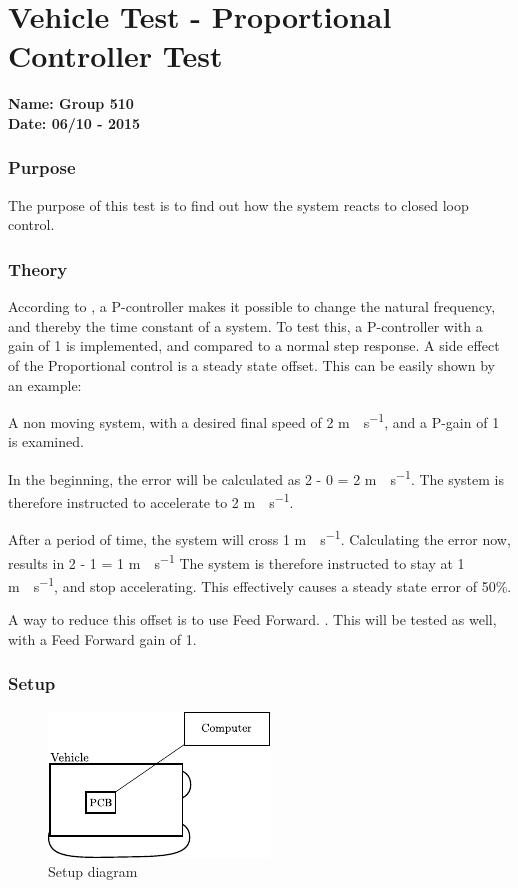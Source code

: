 \pagebreak
\section{Vehicle Test - Proportional Controller Test} \label{app:proportionalControllerTest}
\textbf{Name: Group 510}\\
\textbf{Date: 06/10 - 2015}

\subsubsection{Purpose}
The purpose of this test is to find out how the system reacts to closed loop control.

\subsubsection{Theory}
According to \cite{Franklin}, a P-controller makes it possible to change the natural frequency, and thereby the time constant of a system. To test this, a P-controller with a gain of 1 is implemented, and compared to a normal step response.
A side effect of the Proportional control is a steady state offset. This can be easily shown by an example:

A non moving system, with a desired final speed of 2 \si{m \cdot s^{-1}}, and a P-gain of 1 is examined.

In the beginning, the error will be calculated as 2 - 0 = 2 \si{m \cdot s^{-1}}. The system is therefore instructed to accelerate to 2 \si{m \cdot s^{-1}}.

After a period of time, the system will cross 1 \si{m \cdot s^{-1}}. Calculating the error now, results in 2 - 1 = 1 \si{m \cdot s^{-1}}
The system is therefore instructed to stay at 1 \si{m \cdot s^{-1}}, and stop accelerating. This effectively causes a steady state error of 50\%.

A way to reduce this offset is to use Feed Forward. \cite{Aastrom}. This will be tested as well, with a Feed Forward gain of 1.

\subsubsection{Setup}

\begin{figure}[H]
	\centering
	\includegraphics[scale=1.6]{figures/inertiaTestSetupDiagram2.pdf}
	\caption{Setup diagram}
	\label{GainAndTimeTestSetupDiagram}
\end{figure}\vspace{-5mm}

